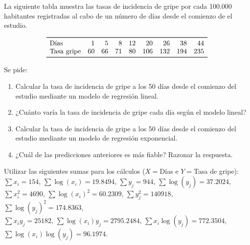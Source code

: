 \documentclass[aspectratio=149,10pt,t]{beamer}
\begin{document}
\begin{frame}[c]
	La siguiente tabla muestra las tasas de incidencia de gripe por cada 100.000 habitantes registradas al cabo de un número de días desde el comienzo de el estudio.

\[
\begin{array}{lrrrrrrrr}
  \toprule
  \mbox{Días} & 1 & 5 & 8 & 12 & 20 & 26 & 38 & 44\\
  \mbox{Tasa gripe} & 60 & 66 & 71 & 80 & 106 & 132 & 194 & 235\\
  \bottomrule
\end{array}
\]

Se pide:

\begin{enumerate}
  \item Calcular la tasa de incidencia de gripe a los 50 días desde el comienzo del estudio mediante un modelo de regresión lineal.
  \item ¿Cuánto varía la tasa de incidencia de gripe cada día según el modelo lineal?
  \item Calcular la tasa de incidencia de gripe a los 50 días desde el comienzo del estudio mediante un modelo de regresión exponencial.
  \item ¿Cuál de las predicciones anteriores es más fiable?
  Razonar la respuesta.
\end{enumerate}
Utilizar las siguientes sumas para los cálculos ($X=$Días e $Y=$Tasa de gripe):\\
$\sum x_i=154$, $\sum \log(x_i)=19.8494$, $\sum y_j=944$, $\sum \log(y_j)=37.2024$,\\
$\sum x_i^2=4690$, $\sum \log(x_i)^2=60.2309$, $\sum y_j^2=140918$, $\sum \log(y_j)^2=174.8363$,\\
$\sum x_iy_j=25182$, $\sum \log(x_i)y_j=2795.2484$, $\sum x_i\log(y_j)=772.3504$, $\sum \log(x_i)\log(y_j)=96.1974$.
\end{frame}
\end{document}
